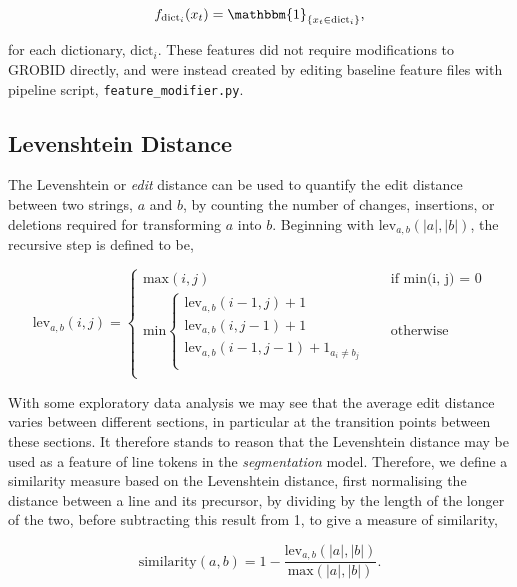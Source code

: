 \begin{equation}
f_{\text{dict}_i}(x_t) = \mathbbm{1}_{\{x_t \in \text{dict}_i\}},
\label{eq:classfunctions}
\end{equation}

for each dictionary, $\text{dict}_i$. These features did not require modifications to GROBID directly, and were instead created by editing baseline feature files with pipeline script, \texttt{feature\_modifier.py}.

\subsection{Levenshtein Distance}

The Levenshtein or \emph{edit} distance can be used to quantify the edit distance between two strings, $a$ and $b$, by counting the number of changes, insertions, or deletions required for transforming $a$ into $b$. Beginning with $\text{lev}_{a, b}(|a|, |b|)$, the recursive step is defined to be,

\begin{equation}
  \text{lev}_{a, b}(i, j) = 
  \begin{cases} 
  	\text{max}(i, j) &\quad\text{if min(i, j) = 0} \\
	\text{min}
		\begin{cases}
			\text{lev}_{a, b}(i - 1, j) + 1 \\
			\text{lev}_{a, b}(i, j - 1) + 1 \\
			\text{lev}_{a, b}(i - 1, j - 1) + 1_{a_i \neq b_j} \\
		\end{cases} &\quad\text{otherwise} \\
  \end{cases}
\label{eq:levenshtein}
\end{equation}

With some exploratory data analysis we may see that the average edit distance varies between different sections, in particular at the transition points between these sections. It therefore stands to reason that the Levenshtein distance may be used as a feature of line tokens in the \emph{segmentation} model. Therefore, we define a similarity measure based on the Levenshtein distance, first normalising the distance between a line and its precursor, by dividing by the length of the longer of the two, before subtracting this result from 1, to give a measure of similarity,

\begin{equation}
\text{similarity}(a, b) = 1 - \frac{\text{lev}_{a, b}(|a|, |b|)}{\text{max}(|a|, |b|)}.
\label{eq:levenshteinsimilarity}
\end{equation}


